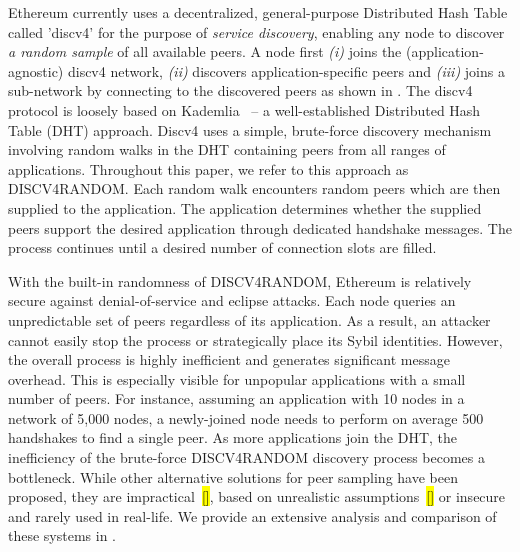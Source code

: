  Ethereum currently uses a decentralized, general-purpose Distributed Hash Table called 'discv4' for the purpose of \textit{service discovery},  enabling any node to discover \textit{a random sample} of all available peers. A node first \textit{(i)} joins the (application-agnostic) discv4 network, \textit{(ii)} discovers application-specific peers and \textit{(iii)} joins a sub-network by connecting to the discovered peers as shown in . The discv4 protocol is loosely based  on Kademlia~\cite{maymounkov2002kademlia} – a well-established Distributed Hash Table (DHT) approach. Discv4 uses a simple, brute-force discovery mechanism involving random walks in the DHT containing peers from all ranges of applications. Throughout this paper, we refer to this approach as DISCV4RANDOM. Each random walk encounters random peers which are then supplied to the application. The application determines whether the supplied peers support the desired application through dedicated handshake messages. The process continues until a desired number of connection slots are filled. 

With the built-in randomness of DISCV4RANDOM, Ethereum is relatively secure against denial-of-service and eclipse attacks. Each node queries an unpredictable set of peers regardless of its application. As a result, an attacker cannot easily stop the process or strategically place its Sybil identities.
However, the overall process is highly inefficient and generates significant message overhead. This is especially visible for unpopular applications with a small number of peers.  For instance, assuming an application with 10 nodes in a network of 5,000 nodes, a newly-joined node needs to perform on average 500 handshakes to find a single peer.  As more applications join the DHT, the inefficiency of the brute-force DISCV4RANDOM discovery process becomes a bottleneck. While other alternative solutions for peer sampling have been proposed, they are impractical~\hl{[]}, based on unrealistic assumptions~\hl{[]} or insecure and rarely used in real-life. We provide an extensive analysis and comparison of these systems in .

